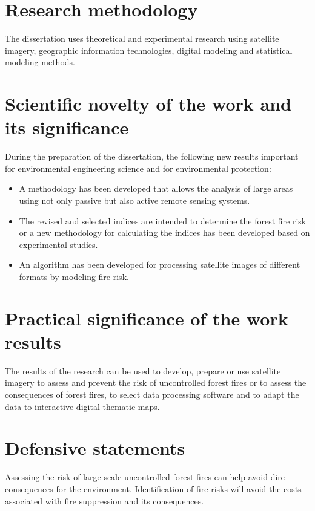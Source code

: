 \section{Research methodology}
	The dissertation uses theoretical and experimental research using satellite imagery, geographic information technologies, digital modeling and statistical modeling methods.

\section{Scientific novelty of the work and its significance}
	During the preparation of the dissertation, the following new results important for environmental engineering science and for environmental protection:
\begin{itemize}
	\item A methodology has been developed that allows the analysis of large areas using not only passive but also active remote sensing systems.
	\item The revised and selected indices are intended to determine the forest fire risk or a new methodology for calculating the indices has been developed based on experimental studies.
	\item An algorithm has been developed for processing satellite images of different formats by modeling fire risk.
\end{itemize}

\section{Practical significance of the work results}
	The results of the research can be used to develop, prepare or use satellite imagery to assess and prevent the risk of uncontrolled forest fires or to assess the consequences of forest fires, to select data processing software and to adapt the data to interactive digital thematic maps.
\section{Defensive statements}
	 Assessing the risk of large-scale uncontrolled forest fires can help avoid dire consequences for the environment. Identification of fire risks will avoid the costs associated with fire suppression and its consequences.
	